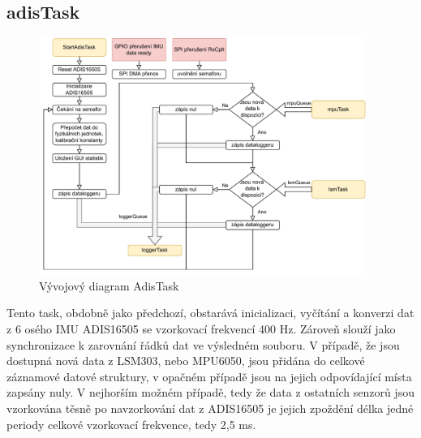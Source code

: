 \subsection{adisTask}
\begin{figure}[h]
    \centering
    \includegraphics[width=0.95\textwidth]{obrazky/AdisTask}
    \caption{Vývojový diagram AdisTask}
\end{figure}
Tento task, obdobně jako předchozí, obstarává inicializaci, vyčítání a konverzi dat z 6 osého IMU ADIS16505 se vzorkovací frekvencí 400 Hz. Zároveň slouží jako synchronizace k zarovnání řádků dat ve výsledném souboru. V případě, že jsou dostupná nová data z LSM303, nebo MPU6050, jsou přidána do celkové záznamové datové struktury, v opačném případě jsou na jejich odpovídající místa zapsány nuly. V nejhorším možném případě, tedy že data z ostatních senzorů jsou vzorkována těsně po navzorkování dat z ADIS16505 je jejich zpoždění délka jedné periody celkové vzorkovací frekvence, tedy 2,5 ms.

